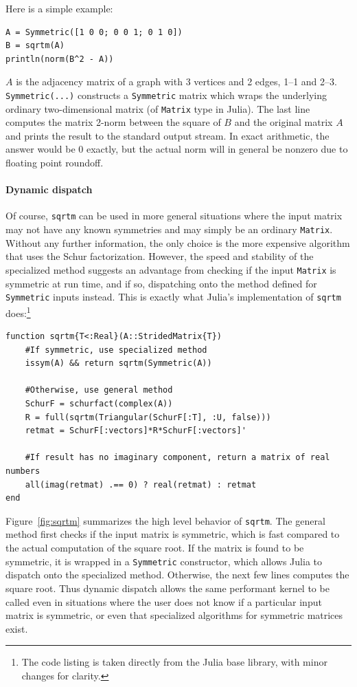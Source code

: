 Here is a simple example:
%
\begin{lstlisting}
A = Symmetric([1 0 0; 0 0 1; 0 1 0])
B = sqrtm(A)
println(norm(B^2 - A))
\end{lstlisting}
%
$A$ is the adjacency matrix of a graph with 3 vertices and 2 edges, 1--1 and
2--3. \lstinline|Symmetric(...)| constructs a \lstinline|Symmetric| matrix
which wraps the underlying ordinary two-dimensional matrix (of
\lstinline|Matrix| type in Julia). The last line computes the matrix 2-norm
between the square of $B$ and the original matrix $A$ and prints the result to
the standard output stream. In exact arithmetic, the answer would be 0 exactly,
but the actual norm will in general be nonzero due to floating point roundoff.

\paragraph{Dynamic dispatch}
Of course, \lstinline|sqrtm| can be used in more general situations where the
input matrix may not have any known symmetries and may simply be an ordinary
\lstinline|Matrix|. Without any further information, the only choice is the
more expensive algorithm that uses the Schur factorization. However, the speed
and stability of the specialized method suggests an advantage from checking if
the input \lstinline|Matrix| is symmetric at run time, and if so, dispatching
onto the method defined for \lstinline|Symmetric| inputs instead. This is
exactly what Julia's implementation of \lstinline|sqrtm| does:\footnote{
The code listing is taken directly from the Julia base library, with minor
changes for clarity.}
%
\begin{lstlisting}
function sqrtm{T<:Real}(A::StridedMatrix{T})
	#If symmetric, use specialized method
	issym(A) && return sqrtm(Symmetric(A))

	#Otherwise, use general method
	SchurF = schurfact(complex(A))
	R = full(sqrtm(Triangular(SchurF[:T], :U, false)))
	retmat = SchurF[:vectors]*R*SchurF[:vectors]'

	#If result has no imaginary component, return a matrix of real numbers
	all(imag(retmat) .== 0) ? real(retmat) : retmat
end
\end{lstlisting}

Figure~\ref{fig:sqrtm} summarizes the high level behavior of \lstinline|sqrtm|.
The general method first checks if the input matrix is symmetric, which is fast
compared to the actual computation of the square root. If the matrix is found to
be symmetric, it is wrapped in a \lstinline|Symmetric| constructor, which allows
Julia to dispatch onto the specialized method. Otherwise, the next few lines
computes the square root. Thus dynamic dispatch allows the same performant
kernel to be called even in situations where the user does not know if a
particular input matrix is symmetric, or even that specialized algorithms for
symmetric matrices exist.


